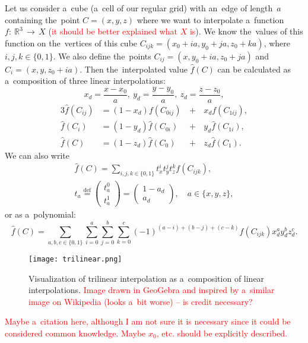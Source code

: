 				Let us consider a~cube (a~cell of our regular grid) with an~edge of length~$a$ containing the~point $C = (x,y,z)$ where we want to interpolate a~function $f\!\!:~\!\!\mathbb{R}^3\,\to\,X$ (\textcolor{red}{it should be better explained what $X$ is}). We know the~values of this function on the~vertices of this cube $C_{ijk} = (x_0+ia,y_0+ja,z_0+ka)$, where $i,j,k \in \{0,1\}$. We also define the~points $C_{ij} = (x,y_0+ia,z_0+ja)$ and $C_i=(x,y,z_0+ia)$. Then the~interpolated value $\widehat{f}(C)$ can be calculated as a~composition of three linear interpolations:
					\begin{equation}
						x_d = \frac{x-x_0}{a},~y_d = \frac{y-y_0}{a},~z_d = \frac{z-z_0}{a},
					\end{equation}
					\begin{alignat}{3}
						\widehat{f}(C_{ij}) &= (1-x_d)f(C_{0ij}) \,&+&\,x_d f(C_{1ij}),\\
						\widehat{f}(C_{i}) &= (1-y_d)\widehat{f}(C_{0i}) &+&\,y_d \widehat{f}(C_{1i}),\\
						\widehat{f}(C) &= (1-z_d)\widehat{f}(C_0) &+&\,z_d \widehat{f}(C_1).
					\end{alignat}
				We can also write
					\begin{eqnarray}
						\widehat{f}(C) = \sum_{i,j,k \in \{0,1\}} t_x^i t_y^j t_z^k f(C_{ijk}),\\
						t_a \stackrel{\text{def}}{=} \begin{pmatrix}t_a^0\\ t_a^1\end{pmatrix} = \begin{pmatrix}1-a_d\\ a_d\end{pmatrix},\quad a \in \{x,y,z\},
					\end{eqnarray}
				or as a~polynomial:
					\begin{equation}
						\widehat{f}(C) = \sum_{a,b,c \in \{0,1\}}\sum^{a}_{i=0}\sum^{b}_{j=0}\sum^{c}_{k=0} (-1)^{(a-i)+(b-j)+(c-k)} f(C_{ijk}) x_d^a y_d^b z_d^c.
					\end{equation}
				
				\begin{figure}
					\centering
					\texttt{[image: trilinear.png]}
					\label{fig:trilin}
					\caption{Visualization of trilinear interpolation as a~composition of linear interpolations. \textcolor{red}{Image drawn in GeoGebra and inspired by a~similar image on Wikipedia (looks a~bit worse) -- is credit necessary?}}
				\end{figure}
				
				\textcolor{red}{Maybe a~citation here, although I am not sure it is necessary since it could be considered common knowledge. Maybe $x_0$, etc. should be explicitly described.}